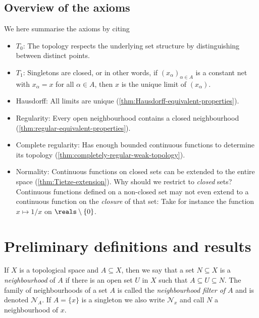 \documentclass[article, a4paper, 11pt, oneside]{memoir}
\numberwithin{equation}{chapter}
\newcommand{\calN}{\mathcal{N}}
\newcommand{\nhoodfilter}[1]{\calN_{#1}}
\begin{document}
\section{Overview of the axioms}

We here summarise the axioms by citing

\begin{itemize}
    \item $T_0$: The topology respects the underlying set structure by distinguishing between distinct points.
    
    \item $T_1$: Singletons are closed, or in other words, if $(x_\alpha)_{\alpha \in A}$ is a constant net with $x_\alpha = x$ for all $\alpha \in A$, then $x$ is the unique limit of $(x_\alpha)$.
    
    \item Hausdorff: All limits are unique (\cref{thm:Hausdorff-equivalent-properties}).
    
    \item Regularity: Every open neighbourhood contains a closed neighbourhood (\cref{thm:regular-equivalent-properties}).
    
    \item Complete regularity: Has enough bounded continuous functions to determine its topology (\cref{thm:completely-regular-weak-topology}).
    
    \item Normality: Continuous functions on closed sets can be extended to the entire space (\cref{thm:Tietze-extension}). Why should we restrict to \emph{closed} sets? Continuous functions defined on a non-closed set may not even extend to a continuous function on the \emph{closure} of that set: Take for instance the function $x \mapsto 1/x$ on $\reals \setminus \{0\}$.
\end{itemize}


\chapter{Preliminary definitions and results}


If $X$ is a topological space and $A \subseteq X$, then we say that a set $N \subseteq X$ is a \emph{neighbourhood} of $A$ if there is an open set $U$ in $X$ such that $A \subseteq U \subseteq N$. The family of neighbourhoods of a set $A$ is called the \emph{neighbourhood filter of $A$} and is denoted $\nhoodfilter{A}$. If $A = \{x\}$ is a singleton we also write $\nhoodfilter{x}$ and call $N$ a neighbourhood of $x$.
\end{document}
